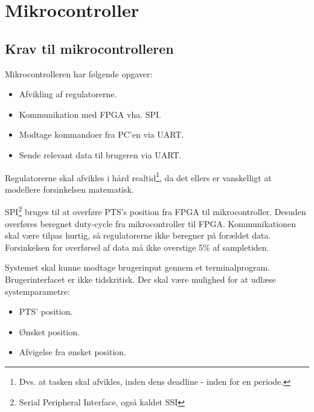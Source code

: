 \section{Mikrocontroller}
\label{sec:mikrocontroller}
\subsection{Krav til mikrocontrolleren}
Mikrocontrolleren har følgende opgaver: 


\begin{itemize}
\itemsep1pt
	\item Afvikling af regulatorerne.
	\item Kommunikation med FPGA vha. SPI.
	\item Modtage kommandoer fra PC'en via UART.
	\item Sende relevant data til brugeren via UART.
\end{itemize}

Regulatorerne skal afvikles i hård realtid\footnote{Dvs. at tasken skal afvikles, inden dens deadline - inden for en periode.}, da det ellers er vanskelligt at modellere forsinkelsen matematisk.


SPI\footnote{Serial Peripheral Interface, også kaldet SSI} bruges til at overføre PTS's position fra FPGA til mikrocontroller. Desuden overføres beregnet duty-cycle fra mikrocontroller til FPGA. Kommunikationen skal være tilpas hurtig, så regulatorerne ikke beregner på forældet data. Forsinkelsen for overførsel af data må ikke overstige 5\% af sampletiden. 

Systemet skal kunne modtage brugerinput gennem et terminalprogram. Brugerinterfacet er ikke tidskritisk. Der skal være mulighed for at udlæse systemparametre:

\begin{itemize}
\itemsep1pt
	\item PTS' position. 
	\item Ønsket position. 
	\item Afvigelse fra ønsket position. 
\end{itemize}

